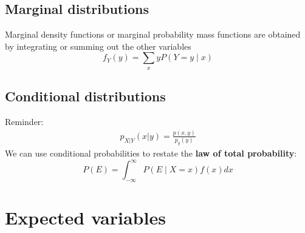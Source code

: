 \documentclass{article}
\begin{document}
\subsection{Marginal distributions}
Marginal density functions or marginal probability mass functions are obtained by integrating or summing out the other variables
\begin{equation*}
    f_Y(y) = \sum_x y P(Y = y \mid x)
\end{equation*}

\subsection{Conditional distributions}
\textrm{Reminder: }
\begin{align*}
    p_{X|Y}(x|y) = \frac{p(x,y)}{p_y(y)}
\end{align*}
We can use conditional probabilities to restate the \textbf{law of total probability}:
\begin{equation*}
    P(E) = \int_{-\infty}^\infty P(E \mid X=x)f(x)dx
\end{equation*}




\section{Expected variables}
\end{document}
